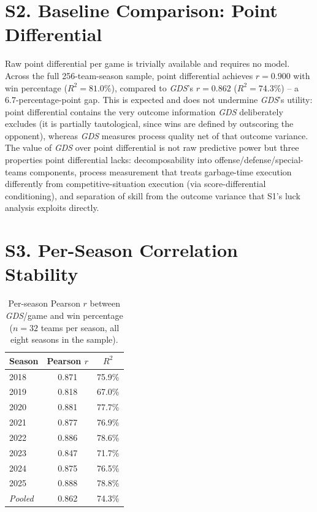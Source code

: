 \documentclass[12pt,a4paper]{article}
\newcommand{\gds}{\textit{GDS}}
\begin{document}
\section*{S2. Baseline Comparison: Point Differential}

Raw point differential per game is trivially available and requires no model. Across the full
256-team-season sample, point differential achieves $r = 0.900$ with win percentage
($R^2 = 81.0\%$), compared to \gds{}'s $r = 0.862$ ($R^2 = 74.3\%$) -- a 6.7-percentage-point
gap. This is expected and does not undermine \gds{}'s utility: point differential contains the
very outcome information \gds{} deliberately excludes (it is partially tautological, since wins
are defined by outscoring the opponent), whereas \gds{} measures process quality net of that
outcome variance. The value of \gds{} over point differential is not raw predictive power but
three properties point differential lacks: decomposability into offense/defense/special-teams
components, process measurement that treats garbage-time execution differently from
competitive-situation execution (via score-differential conditioning), and separation of skill
from the outcome variance that S1's luck analysis exploits directly.

\section*{S3. Per-Season Correlation Stability}

\begin{table}[htbp]
  \centering
  \caption{Per-season Pearson $r$ between \gds{}/game and win percentage ($n = 32$ teams per
  season, all eight seasons in the sample).}
  \begin{tabular}{lcc}
    \toprule
    \textbf{Season} & \textbf{Pearson $r$} & \textbf{$R^2$} \\
    \midrule
    2018 & 0.871 & 75.9\% \\
    2019 & 0.818 & 67.0\% \\
    2020 & 0.881 & 77.7\% \\
    2021 & 0.877 & 76.9\% \\
    2022 & 0.886 & 78.6\% \\
    2023 & 0.847 & 71.7\% \\
    2024 & 0.875 & 76.5\% \\
    2025 & 0.888 & 78.8\% \\
    \midrule
    \textit{Pooled} & 0.862 & 74.3\% \\
    \bottomrule
  \end{tabular}
\end{table}
\end{document}

